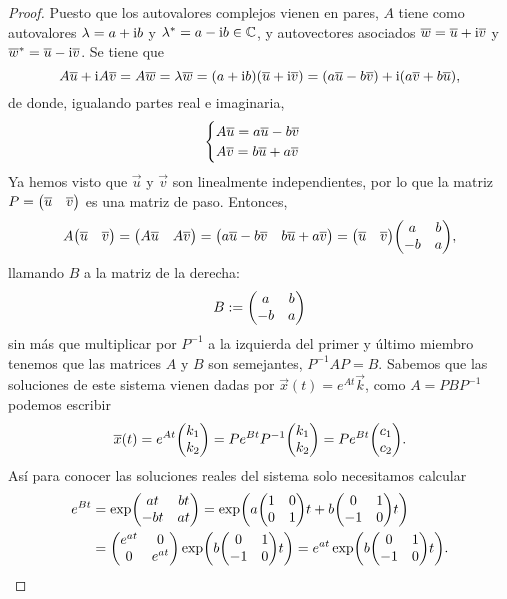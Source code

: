 \documentclass[../ecuaciones_diferenciales.tex]{subfiles}
\begin{document}
\begin{proof}
	Puesto que los autovalores complejos vienen en pares, \(A\) tiene como
	autovalores \(\lambda = a + \mathrm{i} b\) y 
	\({\lambda}^\ast = a - \mathrm{i} b \in \mathbb{C}\), 
	y autovectores asociados 
	\(\overline{w} = \overline{u} + \mathrm{i}\overline{v}\) y 
	\({\overline{w}}^\ast = \overline{u} - \mathrm{i}\overline{v}\). Se tiene que
	\[A\overline{u} + \mathrm{i} A\overline{v} 
		= A\overline{w} = \lambda \overline{w} 
		= (a + \mathrm{i} b)(\overline{u} + \mathrm{i} \overline{v}) 
		= (a\overline{u} - b\overline{v}) + \mathrm{i}(a\overline{v} + b\overline{u}),\]
	de donde, igualando partes real e imaginaria,
	\[\begin{cases}
		A\overline{u} = a\overline{u} - b\overline{v} \\
		A\overline{v} = b\overline{u} + a\overline{v}\end{cases}\]
	Ya hemos visto que \(\vec{u}\) y \(\vec{v}\) son linealmente independientes,
	por lo que la matriz \(P = \begin{pmatrix}\overline{u} & \overline{v}\end{pmatrix}\) 
	es una matriz de paso. Entonces,
	\[A \mat{\vec{u} & \vec{v}} 
		= \mat{A\vec{u} & A\vec{v}} 
		= \mat{a\vec{u} - b\vec{v} & b\vec{u} + a\vec{v}} 
		= \mat{\vec{u} & \vec{v}} \mat{a & b \\ -b & a},\]
	llamando \(B\) a la matriz de la derecha:
	\[B := \begin{pmatrix}a & b \\ -b & a\end{pmatrix}\]
	sin más que multiplicar por \(P^{-1}\) a la izquierda del primer y último
	miembro tenemos que las matrices \(A\) y \(B\) son semejantes, 
	\(P^{-1}AP = B\). 
	Sabemos que las soluciones de este sistema vienen dadas por 
	\(\vec{x}(t) = e^{At} \vec{k}\), como \(A = PBP^{-1}\) podemos escribir 
	\[\vec{x}(t) = e^{At} \mat{k_1 \\ k_2} 
		= P e^{Bt} P^{-1} \mat{k_1 \\ k_2} 
		= P e^{Bt} \mat{c_1 \\ c_2}.\]
	Así para conocer las soluciones reales del sistema solo necesitamos calcular
	\begin{align*}
		e^{Bt} &= \exp\mat{at & bt \\ -bt & at} 
			= \exp\parens{a\mat{1 & 0 \\ 0 & 1}t + b\mat{0 & 1 \\ -1 & 0}t} \\
			&= \mat{e^{at}  & 0 \\ 0 & e^{at}} 
			\exp\left(b\mat{0 & 1 \\ -1 & 0}t\right) 
			= e^{at}\exp\left(b\mat{0 & 1 \\ -1 & 0}t\right).
	\end{align*}
	

\end{proof}
\end{document}

